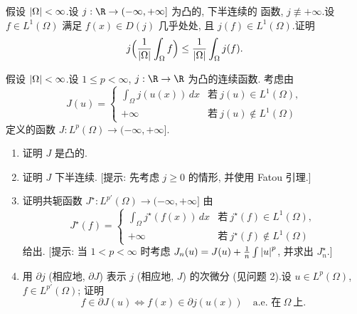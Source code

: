 \begin{exercise}
\label{exer:4.9}
假设 $\left|\Omega\right|<\infty$.设 $j:\R\to(-\infty,+\infty]$ 为凸的, 下半连续的
函数, $j\not\equiv+\infty$.设 $f\in L^1(\Omega)$ 满足 $f(x)\in D(j)$ 几乎处处,
且 $j(f)\in L^1(\Omega)$.证明
\begin{equation*}
j\Bigl(\frac1{\left|\Omega\right|}\int_\Omega f\Bigr)
\le\frac1{\left|\Omega\right|}\int_\Omega j(f).
\end{equation*}
\end{exercise}

\begin{exercise}[凸被积函数]
\label{exer:4.10}
假设 $\left|\Omega\right|<\infty$.设 $1\le p<\infty$, $j:\R\to\R$ 为凸的连续函数.
考虑由
\begin{equation*}
J(u)=\begin{cases}
\displaystyle\int_\Omega j(u(x))\,dx & \text{若}\ j(u)\in L^1(\Omega),\\[8pt]
+\infty & \text{若}\ j(u)\notin L^1(\Omega)
\end{cases}
\end{equation*}
定义的函数 $J:L^p(\Omega)\to(-\infty,+\infty]$.
\begin{enumerate}[label=\arabic*., leftmargin=2.2em, itemsep=0.35em]
	\item 证明 $J$ 是凸的.
	\item 证明 $J$ 下半连续.
	      [提示: 先考虑 $j\ge0$ 的情形, 并使用 Fatou 引理.]
	\item 证明共轭函数 $J^\star:L^{p'}(\Omega)\to(-\infty,+\infty]$ 由
	      \begin{equation*}
	      J^\star(f)=\begin{cases}
	      \displaystyle\int_\Omega j^\star(f(x))\,dx & \text{若}\ j^\star(f)\in L^1(\Omega),\\[8pt]
	      +\infty & \text{若}\ j^\star(f)\notin L^1(\Omega)
	      \end{cases}
	      \end{equation*}
	      给出.
	      [提示: 当 $1<p<\infty$ 时考虑
	      $J_n(u)=J(u)+\frac1n\int\left|u\right|^p$, 并求出 $J_n^\star$.]
	\item 用 $\partial j$ (相应地, $\partial J$) 表示 $j$ (相应地, $J$) 的次微分
	      (见问题 2).设 $u\in L^p(\Omega)$, $f\in L^{p'}(\Omega)$; 证明
	      \begin{equation*}
	      f\in\partial J(u)\iff f(x)\in\partial j(u(x))\quad\text{a.e. 在}\
	      \Omega\ \text{上}.
	      \end{equation*}
\end{enumerate}
\end{exercise}

